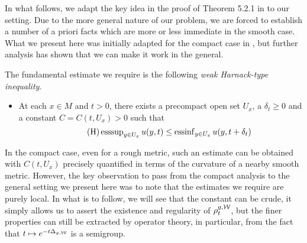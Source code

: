 \documentclass[a4paper, 12pt]{amsart}
\begin{document}
In what follows, we adapt the key idea in 
the proof of Theorem 5.2.1 in \cite{Davies}
to our setting. Due to the more general 
nature of our problem, we are forced to 
establish a number of a priori facts which 
are more or less immediate in the smooth case.
What we present here was initially adapted for the
compact case in \cite{BRough}, but further analysis
has shown that we can make it work in the general.

The fundamental estimate we
require is the following \emph{weak Harnack-type inequality}.
\begin{itemize}
\item[] At each $x \in M$ and $t > 0$, there exists a precompact
open set $U_x$, a $\delta_t \geq 0$ and a constant $C = C(t, U_x)  > 0$ such that
\begin{equation}
\tag{H}
\label{eq:Harnack}
\operatorname{esssup}_{y \in U_x} u(y,t) 
	\leq \operatorname{essinf}_{y \in U_x} u(y, t + \delta_t)
\end{equation}
\end{itemize}

In the compact case, even for a
rough metric, such an estimate can be
obtained with $C(t,U_x)$ precisely quantified
in terms of the curvature of a nearby smooth metric.
However, the key observation to pass from the compact analysis
to the general setting we present here was to note that
the estimates we require are purely local. In 
what is to follow, we will see that the constant can be
crude, it simply allows us to assert the existence and regularity
of $\rho^{g,\mathcal{W}}_t$, but the finer properties can still 
be extracted by operator theory, in particular, from the 
fact that $t \mapsto e^{-t\Delta_{g,\mathcal{W}}}$ is a semigroup.
\end{document}
